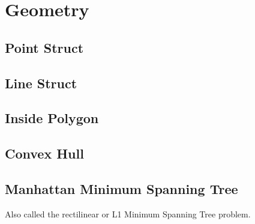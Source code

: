 \chapter{Geometry}

\section{Point Struct}


\section{Line Struct} 


\section{Inside Polygon}



\section{Convex Hull}


\section{Manhattan Minimum Spanning Tree}

    Also called the rectilinear or L1 Minimum Spanning Tree problem.
    
